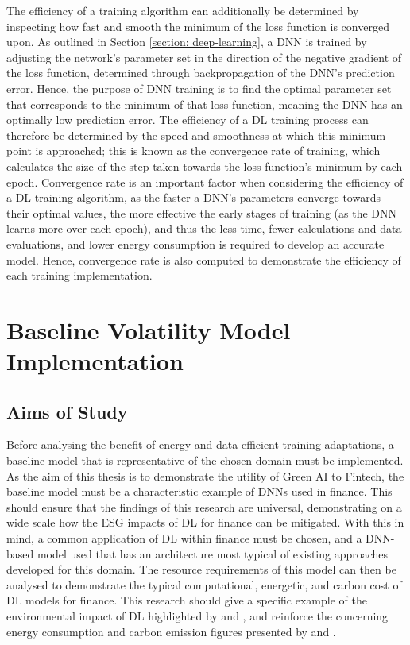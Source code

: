 \documentclass[a4paper, 11pt]{report}
\begin{document}
    The efficiency of a training algorithm can additionally be determined by inspecting how fast and smooth the minimum of the loss function is converged upon. As outlined in Section \ref{section: deep-learning}, a DNN is trained by adjusting the network's parameter set in the direction of the negative gradient of the loss function, determined through backpropagation of the DNN's prediction error. Hence, the purpose of DNN training is to find the optimal parameter set that corresponds to the minimum of that loss function, meaning the DNN has an optimally low prediction error. The efficiency of a DL training process can therefore be determined by the speed and smoothness at which this minimum point is approached; this is known as the convergence rate of training, which calculates the size of the step taken towards the loss function's minimum by each epoch. Convergence rate is an important factor when considering the efficiency of a DL training algorithm, as the faster a DNN's parameters converge towards their optimal values, the more effective the early stages of training (as the DNN learns more over each epoch), and thus the less time, fewer calculations and data evaluations, and lower energy consumption is required to develop an accurate model. Hence, convergence rate is also computed to demonstrate the efficiency of each training implementation.


    \section{Baseline Volatility Model Implementation}
    \label{section: baseline}

    \subsection{Aims of Study}

    Before analysing the benefit of energy and data-efficient training adaptations, a baseline model that is representative of the chosen domain must be implemented. As the aim of this thesis is to demonstrate the utility of Green AI to Fintech, the baseline model must be a characteristic example of DNNs used in finance. This should ensure that the findings of this research are universal, demonstrating on a wide scale how the ESG impacts of DL for finance can be mitigated. With this in mind, a common application of DL within finance must be chosen, and a DNN-based model used that has an architecture most typical of existing approaches developed for this domain. The resource requirements of this model can then be analysed to demonstrate the typical computational, energetic, and carbon cost of DL models for finance. This research should give a specific example of the environmental impact of DL highlighted by \citet{schwartz-2019} and \citet{strubell-2019}, and reinforce the concerning energy consumption and carbon emission figures presented by \citet{hockstad-2018} and \citet{masanet-2020}.
\end{document}
